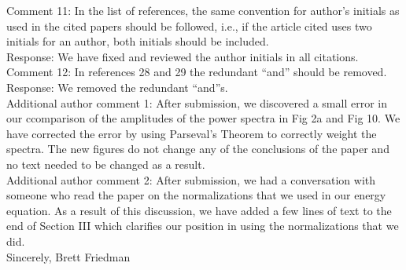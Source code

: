 \documentclass[12pt]{article}
\begin{document}
Comment 11:  In the list of references, the same convention for author’s initials as used in the cited
papers should be followed, i.e., if the article cited uses two initials for an author, both
initials should be included. \\

Response: We have fixed and reviewed the author initials in all citations. \\

Comment 12: In references 28 and 29 the redundant “and” should be removed. \\

Response: We removed the redundant ``and''s. \\


Additional author comment 1: After submission, we discovered a small error in our ccomparison of the amplitudes of the power spectra in Fig 2a and Fig 10. 
We have corrected the error by using Parseval's Theorem to correctly weight the spectra. The new figures do not change any of the conclusions of the paper and no text needed to be changed as a result. \\

Additional author comment 2: After submission, we had a conversation with someone who read the paper on the normalizations that we used in our energy equation. As a result of this discussion,
we have added a few lines of text to the end of Section III which clarifies our position in using the normalizations that we did. \\

Sincerely,
Brett Friedman
\end{document}
